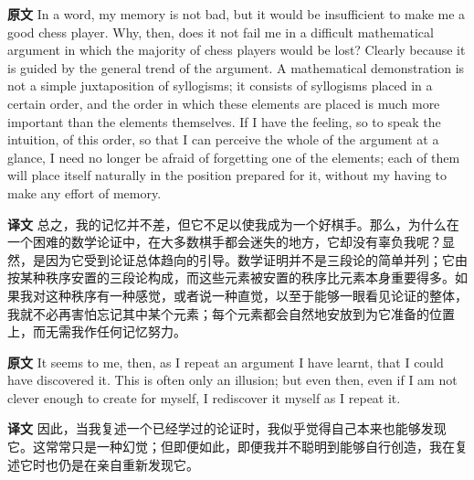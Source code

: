 \documentclass[UTF8]{ctexart}
\newenvironment{english}{\par\small\noindent\textbf{原文}\quad\ignorespaces}{\par}
\newenvironment{zhtranslation}{\par\noindent\textbf{译文}\quad\ignorespaces}{\par\vspace{0.35em}}
\begin{document}
\begin{english}
In a word, my memory is not bad, but it would be insufficient to make me a good chess player. Why, then, does it not fail me in a difficult mathematical argument in which the majority of chess players would be lost? Clearly because it is guided by the general trend of the argument. A mathematical demonstration is not a simple juxtaposition of syllogisms; it consists of syllogisms placed in a certain order, and the order in which these elements are placed is much more important than the elements themselves. If I have the feeling, so to speak the intuition, of this order, so that I can perceive the whole of the argument at a glance, I need no longer be afraid of forgetting one of the elements; each of them will place itself naturally in the position prepared for it, without my having to make any effort of memory.
\end{english}
\begin{zhtranslation}
总之，我的记忆并不差，但它不足以使我成为一个好棋手。那么，为什么在一个困难的数学论证中，在大多数棋手都会迷失的地方，它却没有辜负我呢？显然，是因为它受到论证总体趋向的引导。数学证明并不是三段论的简单并列；它由按某种秩序安置的三段论构成，而这些元素被安置的秩序比元素本身重要得多。如果我对这种秩序有一种感觉，或者说一种直觉，以至于能够一眼看见论证的整体，我就不必再害怕忘记其中某个元素；每个元素都会自然地安放到为它准备的位置上，而无需我作任何记忆努力。\end{zhtranslation}

\begin{english}
It seems to me, then, as I repeat an argument I have learnt, that I could have discovered it. This is often only an illusion; but even then, even if I am not clever enough to create for myself, I rediscover it myself as I repeat it.
\end{english}
\begin{zhtranslation}
因此，当我复述一个已经学过的论证时，我似乎觉得自己本来也能够发现它。这常常只是一种幻觉；但即便如此，即便我并不聪明到能够自行创造，我在复述它时也仍是在亲自重新发现它。\end{zhtranslation}
\end{document}
